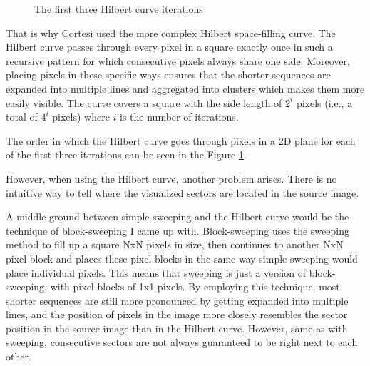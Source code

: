 \documentclass[
  digital, %
  color,   %
  oneside, %
  lof,     %
  nolot,     %
]{fithesis4}
\begin{document}
\begin{figure}
\begin{center}
\begin{minipage}{.3\textwidth}
\begin{center}
      \end{center}
    \end{minipage}
  \end{center}
  \caption{The first three Hilbert curve iterations}
  \label{fig:hilbertiters}
\end{figure}

That is why Cortesi\cite{cortesi11} used the more complex Hilbert space-filling curve.
The Hilbert curve passes through every pixel in a square exactly once in such a recursive pattern for which consecutive pixels always share one side.\cite{hilbert91}
Moreover, placing pixels in these specific ways ensures that the shorter sequences are expanded into multiple lines and aggregated into clusters which makes them more easily visible.
The curve covers a square with the side length of $2^i$ pixels (i.e., a total of $4^i$ pixels) where $i$ is the number of iterations.

The order in which the Hilbert curve goes through pixels in a 2D plane for each of the first three iterations can be seen in the Figure \ref{fig:hilbertiters}.

However, when using the Hilbert curve, another problem arises.
There is no intuitive way to tell where the visualized sectors are located in the source image.

A middle ground between simple sweeping and the Hilbert curve would be the technique of block-sweeping I came up with.
Block-sweeping uses the sweeping method to fill up a square NxN pixels in size, then continues to another NxN pixel block and places these pixel blocks in the same way simple sweeping would place individual pixels.
This means that sweeping is just a version of block-sweeping, with pixel blocks of 1x1 pixels.
By employing this technique, most shorter sequences are still more pronounced by getting expanded into multiple lines, and the position of pixels in the image more closely resembles the sector position in the source image than in the Hilbert curve.
However, same as with sweeping, consecutive sectors are not always guaranteed to be right next to each other.
\end{document}

